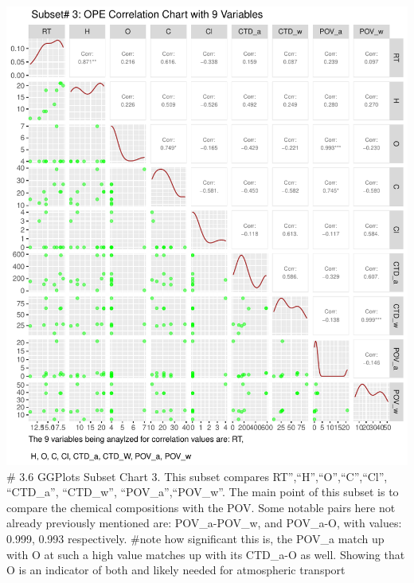 \documentclass[journal=jacsat,manuscript=article]{achemso}
\begin{document}
\includegraphics{Rahmi_Chowdhury_500621744_Final_project_files/figure-latex/unnamed-chunk-7-1.pdf}
\# 3.6 GGPlots Subset Chart 3. This subset compares
RT'',``H'',``O'',``C'',``Cl'', ``CTD\_a'', ``CTD\_w'',
``POV\_a'',``POV\_w''. The main point of this subset is to compare the
chemical compositions with the POV. Some notable pairs here not already
previously mentioned are: POV\_a-POV\_w, and POV\_a-O, with values:
0.999, 0.993 respectively. \#note how significant this is, the POV\_a
match up with O at such a high value matches up with its CTD\_a-O as
well. Showing that O is an indicator of both and likely needed for
atmospheric transport
\end{document}
